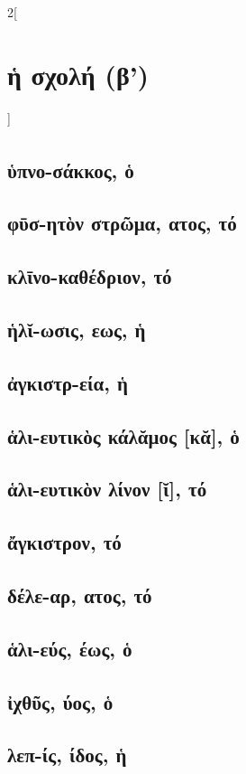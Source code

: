 \documentclass{book}
\begin{document}
\begin{multicols}{2}[\section{ἡ σχολή (β')}] 
\subsection{ὑπνο-σάκκος\textsuperscript{\textdagger}, ὁ}
\subsection{φῡσ-ητὸν στρῶμα, ατος, τό}
\subsection{κλῑνο-καθέδριον, τό}
\subsection{ἡλῐ-ωσις, εως, ἡ}
\subsection{ἀγκιστρ-εία, ἡ}
\subsection{ἁλι-ευτικὸς κάλᾰμος [κᾰ], ὁ}
\subsection{ἁλι-ευτικὸν λίνον [ῐ], τό}
\subsection{ἄγκιστρον, τό}
\subsection{δέλε-αρ, ατος, τό}
\subsection{ἁλι-εύς, έως, ὁ}
\subsection{ἰχθῦς, ύος, ὁ}
\subsection{λεπ-ίς, ίδος, ἡ}
~
\end{multicols}
\end{document}
